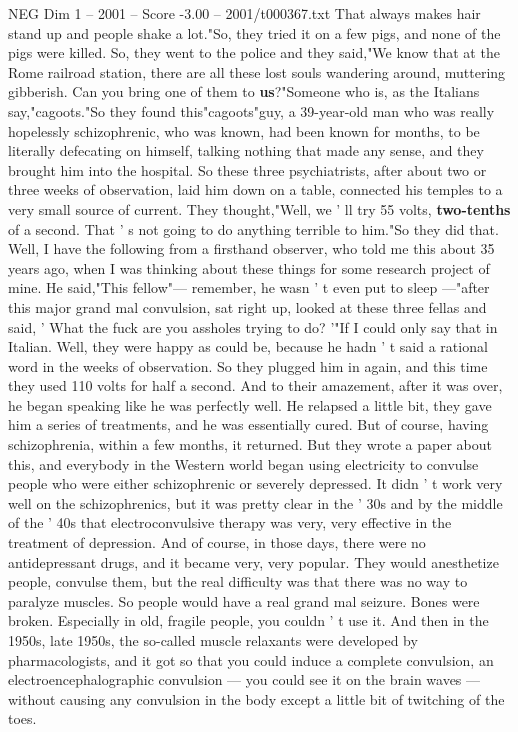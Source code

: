 \begin{textsample}{NEG Dim 1 – 2001 – Score -3.00 – 2001/t000367.txt}
That always makes hair stand up and people shake a lot."So, they tried it on a few pigs, and none of the pigs were killed.
So, they went to the police and they said,"We know that at the Rome railroad station, there are all these lost souls wandering around, muttering gibberish.
Can you bring one of them to \textbf{us}?"Someone who is, as the Italians say,"cagoots."So they found this"cagoots"guy, a 39-year-old man who was really hopelessly schizophrenic, who was known, had been known for months, to be literally defecating on himself, talking nothing that made any sense, and they brought him into the hospital.
So these three psychiatrists, after about two or three weeks of observation, laid him down on a table, connected his temples to a very small source of current.
They thought,"Well, we ' ll try 55 volts, \textbf{two-tenths} of a second.
That ' s not going to do anything terrible to him."So they did that.
Well, I have the following from a firsthand observer, who told me this about 35 years ago, when I was thinking about these things for some research project of mine.
He said,"This fellow"— remember, he wasn ' t even put to sleep —"after this major grand mal convulsion, sat right up, looked at these three fellas and said, ' What the fuck are you assholes trying to do? '"If I could only say that in Italian.
Well, they were happy as could be, because he hadn ' t said a rational word in the weeks of observation.
So they plugged him in again, and this time they used 110 volts for half a second.
And to their amazement, after it was over, he began speaking like he was perfectly well.
He relapsed a little bit, they gave him a series of treatments, and he was essentially cured.
But of course, having schizophrenia, within a few months, it returned.
But they wrote a paper about this, and everybody in the Western world began using electricity to convulse people who were either schizophrenic or severely depressed.
It didn ' t work very well on the schizophrenics, but it was pretty clear in the ' 30s and by the middle of the ' 40s that electroconvulsive therapy was very, very effective in the treatment of depression.
And of course, in those days, there were no antidepressant drugs, and it became very, very popular.
They would anesthetize people, convulse them, but the real difficulty was that there was no way to paralyze muscles.
So people would have a real grand mal seizure.
Bones were broken.
Especially in old, fragile people, you couldn ' t use it.
And then in the 1950s, late 1950s, the so-called muscle relaxants were developed by pharmacologists, and it got so that you could induce a complete convulsion, an electroencephalographic convulsion — you could see it on the brain waves — without causing any convulsion in the body except a little bit of twitching of the toes.

\end{textsample}
